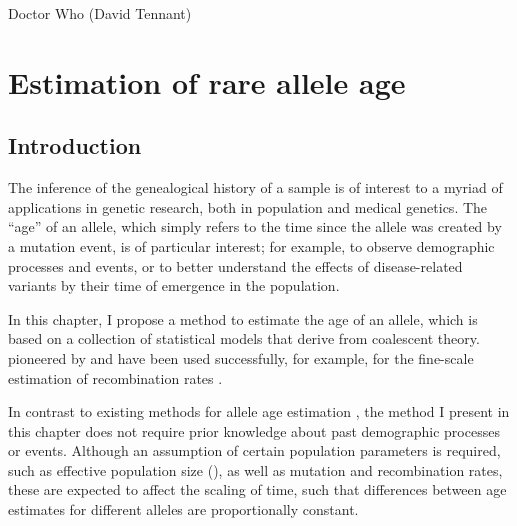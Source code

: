 
\glsresetall


{Doctor Who (David Tennant)}


{
\singlespacing
\chapter{Estimation of rare allele age}
\label{ch:rvage}
\minitoc
}


%
\section{Introduction}
%

The inference of the genealogical history of a sample is of interest to a myriad of applications in genetic research, both in population and medical genetics.
The ``age'' of an allele, which simply refers to the time since the allele was created by a mutation event, is of particular interest; for example, to observe demographic processes and events, or to better understand the effects of disease-related variants by their time of emergence in the population.

In this chapter, I propose a  method to estimate the age of an allele, which is based on a collection of statistical models that derive from coalescent theory.
 pioneered by \citet{Hudson:2001vs} and have been used successfully, for example, for the fine-scale estimation of recombination rates \citep{McVean:2004ca,Myers:2005vi}.

In contrast to existing methods for allele age estimation \citep[\eg, see review by][]{Slatkin:2000us}, the method I present in this chapter does not require prior knowledge about past demographic processes or events.
Although an assumption of certain population parameters is required, such as effective population size (\Ne), as well as mutation and recombination rates, these are expected to affect the scaling of time, such that differences between age estimates for different alleles are proportionally constant.

